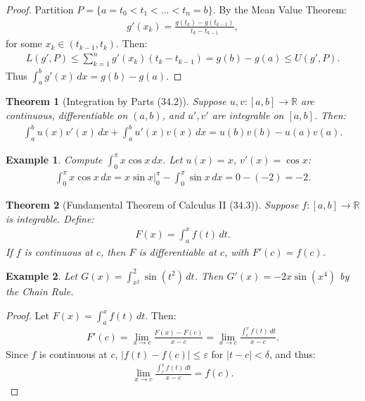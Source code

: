 \documentclass[7pt]{article}
\theoremstyle{definition}
\theoremstyle{plain}
\newtheorem{theorem}{Theorem}
\newtheorem{example}{Example}
\begin{document}
\begin{proof}
Partition $ P = \{a = t_0 < t_1 < \ldots < t_n = b\} $. By the Mean Value Theorem:
\begin{align}
g'(x_k) = \frac{g(t_k) - g(t_{k-1})}{t_k - t_{k-1}},
\end{align}
for some $ x_k \in (t_{k-1}, t_k) $. Then:
\begin{align}
L(g', P) \leq \sum_{k=1}^n g'(x_k)(t_k - t_{k-1}) = g(b) - g(a) \leq U(g', P).
\end{align}
Thus $ \int_a^b g'(x) \, dx = g(b) - g(a) $.
\end{proof}

\begin{theorem}[Integration by Parts (34.2)]
Suppose $ u, v : [a, b] \to \mathbb{R} $ are continuous, differentiable on $ (a, b) $, and $ u', v' $ are integrable on $ [a, b] $. Then:
\begin{align}
\int_a^b u(x)v'(x) \, dx + \int_a^b u'(x)v(x) \, dx = u(b)v(b) - u(a)v(a).
\end{align}
\end{theorem}

\begin{example}
Compute $ \int_0^\pi x \cos x \, dx $. Let $ u(x) = x $, $ v'(x) = \cos x $:
\begin{align}
\int_0^\pi x \cos x \, dx = x \sin x \big|_0^\pi - \int_0^\pi \sin x \, dx = 0 - (-2) = -2.
\end{align}
\end{example}

\begin{theorem}[Fundamental Theorem of Calculus II (34.3)]
Suppose $ f : [a, b] \to \mathbb{R} $ is integrable. Define:
\begin{align}
F(x) = \int_a^x f(t) \, dt.
\end{align}
If $ f $ is continuous at $ c $, then $ F $ is differentiable at $ c $, with $ F'(c) = f(c) $.
\end{theorem}

\begin{example}
Let $ G(x) = \int_{x^2}^2 \sin(t^2) \, dt $. Then $ G'(x) = -2x \sin(x^4) $ by the Chain Rule.
\end{example}

\begin{proof}
Let $ F(x) = \int_a^x f(t) \, dt $. Then:
\begin{align}
F'(c) = \lim_{x \to c} \frac{F(x) - F(c)}{x - c} = \lim_{x \to c} \frac{\int_c^x f(t) \, dt}{x - c}.
\end{align}
Since $ f $ is continuous at $ c $, $ |f(t) - f(c)| \leq \varepsilon $ for $ |t - c| < \delta $, and thus:
\begin{align}
\lim_{x \to c} \frac{\int_c^x f(t) \, dt}{x - c} = f(c).
\end{align}
\end{proof}
\end{document}
